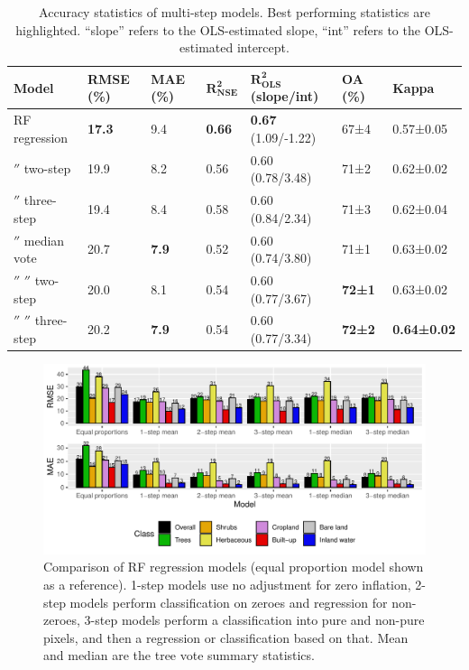 \documentclass[review,authoryear,3p]{elsarticle}
\begin{document}
\begin{table}
\centering
\begin{tabular}{lllllll}
\toprule
\textbf{Model} & \textbf{\ac{RMSE} (\%)} & \textbf{\ac{MAE} (\%)} & $\mathbf{R^2_{NSE}}$ & $\mathbf{R^2_{OLS}}$ (slope/int) & \textbf{\ac{OA} (\%)} & \textbf{Kappa} \\
\midrule
\Gls{RF} regression
& \textbf{17.3}  & 9.4   & \textbf{0.66}  & \textbf{0.67} (1.09/-1.22) & 67±4  & 0.57±0.05 \\
\ensuremath{''} two-step
& 19.9  & 8.2   & 0.56  & 0.60 (0.78/3.48) & 71±2  & 0.62±0.02 \\
\ensuremath{''} three-step
& 19.4  & 8.4   & 0.58  & 0.60 (0.84/2.34) & 71±3  & 0.62±0.04 \\
\ensuremath{''} median vote
& 20.7  & \textbf{7.9}   & 0.52  & 0.60 (0.74/3.80) & 71±1  & 0.63±0.02 \\
\ensuremath{''} \ensuremath{''} two-step
& 20.0  & 8.1   & 0.54  & 0.60 (0.77/3.67) & \textbf{72±1}  & 0.63±0.02 \\
\ensuremath{''} \ensuremath{''} three-step
& 20.2  & \textbf{7.9}   & 0.54  & 0.60 (0.77/3.34) & \textbf{72±2}  & \textbf{0.64±0.02} \\
\bottomrule
\end{tabular}
\caption{Accuracy statistics of multi-step models. Best performing statistics are highlighted. ``slope'' refers to the OLS-estimated slope, ``int'' refers to the OLS-estimated intercept.}
\label{tab-accuracy}
\end{table}

\begin{figure}
    \centering
    \includegraphics[width=\textwidth]{article-figures/barplots/2020-06-04-rf-comparison-bar}
    \caption{Comparison of \gls{RF} regression models (equal proportion model shown as a reference). 1-step models use no adjustment for zero inflation, 2-step models perform classification on zeroes and regression for non-zeroes, 3-step models perform a classification into pure and non-pure pixels, and then a regression or classification based on that. Mean and median are the tree vote summary statistics.}
    \label{fig-randomforest}
\end{figure}
\end{document}
